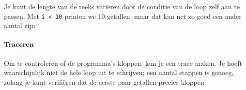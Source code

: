 Je kunt de lengte van de reeks vari\"{e}ren door de conditie van de loop zelf aan te passen. Met \texttt{i < 10} printen we 10 getallen, maar dat kan net zo goed een ander aantal zijn.

\paragraph{Traceren}

Om te controleren of de programma's kloppen, kun je een trace maken. Je hoeft waarschijnlijk niet de hele loop uit te schrijven; een aantal stappen is genoeg, zolang je kunt verifi\"{e}ren dat de eerste paar getallen precies kloppen.

%
